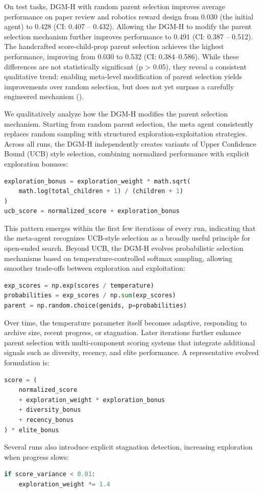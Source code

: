 \documentclass{article}
\begin{document}
On test tasks, DGM-H with random parent selection improves average performance on paper review and robotics reward design from 0.030 (the initial agent) to 0.428 (CI: 0.407 -- 0.432). Allowing the DGM-H to modify the parent selection mechanism further improves performance to 0.491 (CI: 0.387 -- 0.512). The handcrafted score-child-prop parent selection achieves the highest performance, improving from 0.030 to 0.532 (CI: 0.384--0.586). While these differences are not statistically significant (p > 0.05), they reveal a consistent qualitative trend: enabling meta-level modification of parent selection yields improvements over random selection, but does not yet surpass a carefully engineered mechanism ().

We qualitatively analyze how the DGM-H modifies the parent selection mechanism. Starting from random parent selection, the meta agent consistently replaces random sampling with structured exploration-exploitation strategies. Across all runs, the DGM-H independently creates variants of Upper Confidence Bound (UCB) \citep{auer2002finite} style selection, combining normalized performance with explicit exploration bonuses:
\begin{lstlisting}[language=Python]
exploration_bonus = exploration_weight * math.sqrt(
    math.log(total_children + 1) / (children + 1)
)
ucb_score = normalized_score + exploration_bonus
\end{lstlisting}
This pattern emerges within the first few iterations of every run, indicating that the meta-agent recognizes UCB-style selection as a broadly useful principle for open-ended search. Beyond UCB, the DGM-H evolves probabilistic selection mechanisms based on temperature-controlled softmax sampling, allowing smoother trade-offs between exploration and exploitation:
\begin{lstlisting}[language=Python]
exp_scores = np.exp(scores / temperature)
probabilities = exp_scores / np.sum(exp_scores)
parent = np.random.choice(genids, p=probabilities)
\end{lstlisting}
Over time, the temperature parameter itself becomes adaptive, responding to archive size, recent progress, or stagnation. Later iterations further enhance parent selection with multi-component scoring systems that integrate additional signals such as diversity, recency, and elite performance. A representative evolved formulation is:
\begin{lstlisting}[language=Python]
score = (
    normalized_score
    + exploration_weight * exploration_bonus
    + diversity_bonus
    + recency_bonus
) * elite_bonus
\end{lstlisting}
Several runs also introduce explicit stagnation detection, increasing exploration when progress slows:
\begin{lstlisting}[language=Python]
if score_variance < 0.01:
    exploration_weight *= 1.4
\end{lstlisting}
\end{document}
